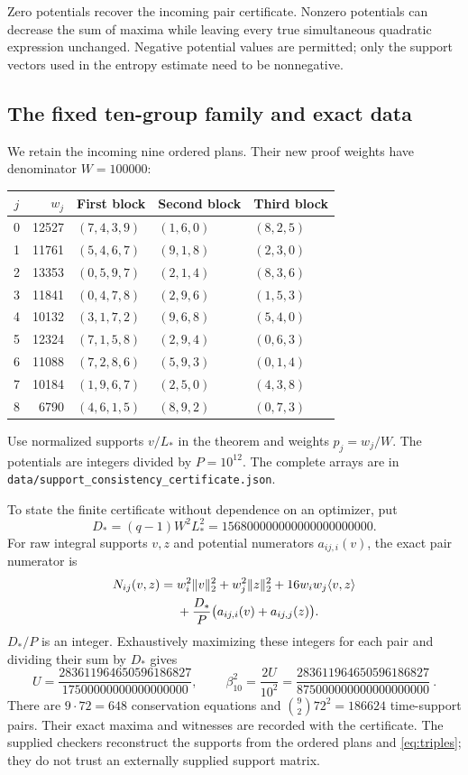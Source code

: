 Zero potentials recover the incoming pair certificate. Nonzero potentials
can decrease the sum of maxima while leaving every true simultaneous
quadratic expression unchanged. Negative potential values are permitted;
only the support vectors used in the entropy estimate need to be
nonnegative.

\subsection{The fixed ten-group family and exact data}

We retain the incoming nine ordered plans. Their new proof weights have
denominator $W=100000$:
\begin{center}\small
\begin{tabular}{crlll}
\toprule $j$ & $w_j$ & First block & Second block & Third block\\
\midrule
0&12527&$(7,4,3,9)$&$(1,6,0)$&$(8,2,5)$\\
1&11761&$(5,4,6,7)$&$(9,1,8)$&$(2,3,0)$\\
2&13353&$(0,5,9,7)$&$(2,1,4)$&$(8,3,6)$\\
3&11841&$(0,4,7,8)$&$(2,9,6)$&$(1,5,3)$\\
4&10132&$(3,1,7,2)$&$(9,6,8)$&$(5,4,0)$\\
5&12324&$(7,1,5,8)$&$(2,9,4)$&$(0,6,3)$\\
6&11088&$(7,2,8,6)$&$(5,9,3)$&$(0,1,4)$\\
7&10184&$(1,9,6,7)$&$(2,5,0)$&$(4,3,8)$\\
8&6790&$(4,6,1,5)$&$(8,9,2)$&$(0,7,3)$\\
\bottomrule
\end{tabular}
\end{center}
Use normalized supports $v/L_*$ in the theorem and weights $p_j=w_j/W$.
The potentials are integers divided by $P=10^{12}$. The complete
arrays are in \texttt{data/support\_consistency\_certificate.json}.

To state the finite certificate without dependence on an optimizer, put
\[
 D_*=(q-1)W^2L_*^2=156800000000000000000000.
\]
For raw integral supports $v,z$ and potential numerators $a_{ij,i}(v)$,
the exact pair numerator is
\begin{align}\label{eq:integer-pair}
 N_{ij}(v,z)={}&w_i^2\lVert v\rVert_2^2+w_j^2\lVert z\rVert_2^2
             +16w_iw_j\langle v,z\rangle\notag\\
 &+\frac{D_*}{P}\bigl(a_{ij,i}(v)+a_{ij,j}(z)\bigr).
\end{align}
$D_*/P$ is an integer. Exhaustively maximizing these integers for each
pair and dividing their sum by $D_*$ gives
\begin{equation}\label{eq:exact-U}
 U=\frac{283611964650596186827}{17500000000000000000},\qquad
 \boxed{\ \beta_{10}^2=\frac{2U}{10^2}
       =\frac{283611964650596186827}{875000000000000000000}\ }.
\end{equation}
There are $9\cdot72=648$ conservation equations and
$\binom92 72^2=186624$ time-support pairs. Their exact maxima and
witnesses are recorded with the certificate. The supplied checkers
reconstruct the supports from the ordered plans and
\eqref{eq:triples}; they do not trust an externally supplied support matrix.

